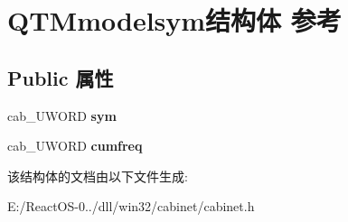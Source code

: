 \hypertarget{struct_q_t_mmodelsym}{}\section{Q\+T\+Mmodelsym结构体 参考}
\label{struct_q_t_mmodelsym}
\subsection*{Public 属性}
\begin{DoxyCompactItemize}
\item 
\mbox{\label{struct_q_t_mmodelsym_af90f48972c5ebce83f74d775d7185c7e}} 
cab\+\_\+\+U\+W\+O\+RD {\bfseries sym}
\item 
\mbox{\label{struct_q_t_mmodelsym_a218d5468ff4d413d31ca4b296eaace94}} 
cab\+\_\+\+U\+W\+O\+RD {\bfseries cumfreq}
\end{DoxyCompactItemize}


该结构体的文档由以下文件生成\+:\begin{DoxyCompactItemize}
\item 
E\+:/\+React\+O\+S-\/0../dll/win32/cabinet/cabinet.\+h\end{DoxyCompactItemize}
